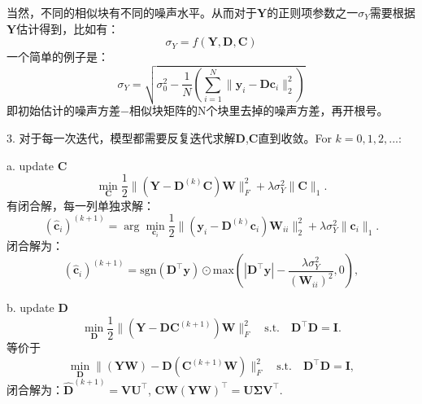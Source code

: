 \documentclass[10pt,twocolumn,letterpaper]{article}
\begin{document}
当然，不同的相似块有不同的噪声水平。从而对于$\mathbf{Y}$的正则项参数之一$\sigma_{Y}$需要根据$\mathbf{Y}$估计得到，比如有：
\begin{equation}
\sigma_{Y} = f(\mathbf{Y},\mathbf{D},\mathbf{C})
\end{equation}
一个简单的例子是：
\begin{equation}
\sigma_{Y} = \sqrt{\sigma_{0}^{2}- \frac{1}{N}(\sum_{i=1}^{N}\|\mathbf{y}_{i}-\mathbf{D}\mathbf{c}_{i}\|_{2}^{2})}
\end{equation}
即初始估计的噪声方差$-$相似块矩阵的N个块里去掉的噪声方差，再开根号。

3. 对于每一次迭代，模型都需要反复迭代求解$\mathbf{D}$,$\mathbf{C}$直到收敛。For $k=0,1,2,...$:

a. update $\mathbf{C}$
\begin{equation}
\min_{\mathbf{C}}\frac{1}{2}\|(\mathbf{Y}-\mathbf{D}^{(k)}\mathbf{C})\mathbf{W}\|_{F}^{2}
+
\lambda\sigma_{Y}^{2}\|\mathbf{C}\|_{1}.
\end{equation}
有闭合解，每一列单独求解：
\begin{equation}
(\hat{\mathbf{c}}_{i})^{(k+1)}
=
\arg\min_{\mathbf{c}_{i}}\frac{1}{2}\|(\mathbf{y}_{i}-\mathbf{D}^{(k)}\mathbf{c}_{i})\mathbf{W}_{ii}\|_{2}^{2}
+
\lambda\sigma_{Y}^{2}\|\mathbf{c}_{i}\|_{1}.
\end{equation}
闭合解为：
\begin{equation}
(\hat{\mathbf{c}}_{i})^{(k+1)}
=
\text{sgn}(\mathbf{D^{\top}y}) 
\odot 
\text{max}(|\mathbf{D^{\top}y}|-\frac{\lambda\sigma_{Y}^{2}}{(\mathbf{W}_{ii})^{2}},0),
\end{equation}

b. update $\mathbf{D}$
\begin{equation}
\min_{\mathbf{D}}\frac{1}{2}\|(\mathbf{Y}-\mathbf{D}\mathbf{C}^{(k+1)})\mathbf{W}\|_{F}^{2}
\quad
\text{s.t.}
\quad
\mathbf{D}^{\top}\mathbf{D} =\mathbf{I}. 
\end{equation}
等价于
\begin{equation}
\min_{\mathbf{D}}\|(\mathbf{Y}\mathbf{W})-\mathbf{D}(\mathbf{C}^{(k+1)}\mathbf{W})\|_{F}^{2}
\quad
\text{s.t.}
\quad
\mathbf{D}^{\top}\mathbf{D} = \mathbf{I},
\end{equation}
闭合解为：$\hat{\mathbf{D}}^{(k+1)}=\mathbf{V}\mathbf{U}^{\top}$, $\mathbf{C}\mathbf{W}(\mathbf{Y}\mathbf{W})^{\top}=\mathbf{U}\mathbf{\Sigma}\mathbf{V}^{\top}$.

{
\small


}
\end{document}
